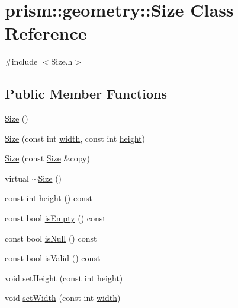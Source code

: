 \hypertarget{classprism_1_1geometry_1_1_size}{}\section{prism\+:\+:geometry\+:\+:Size Class Reference}
\label{classprism_1_1geometry_1_1_size}


{\ttfamily \#include $<$Size.\+h$>$}

\subsection*{Public Member Functions}
\begin{DoxyCompactItemize}
\item 
\hyperlink{classprism_1_1geometry_1_1_size_a82ca178677fefa36453103441b0e16d1}{Size} ()
\item 
\hyperlink{classprism_1_1geometry_1_1_size_a3df901a89d7ba9222266e45eea14aa80}{Size} (const int \hyperlink{classprism_1_1geometry_1_1_size_af52e54cbd5b29a1d9a2dfd3b56007d68}{width}, const int \hyperlink{classprism_1_1geometry_1_1_size_af4879e8eca4306cfe5d39b800ae191d1}{height})
\item 
\hyperlink{classprism_1_1geometry_1_1_size_a7a5a003c2ed1e52fc3c95e2abdeddee5}{Size} (const \hyperlink{classprism_1_1geometry_1_1_size}{Size} \&copy)
\item 
virtual \hyperlink{classprism_1_1geometry_1_1_size_a537e42c6a73305321ce4b8b28c7e1c90}{$\sim$\+Size} ()
\item 
const int \hyperlink{classprism_1_1geometry_1_1_size_af4879e8eca4306cfe5d39b800ae191d1}{height} () const 
\item 
const bool \hyperlink{classprism_1_1geometry_1_1_size_aa9b519af8f5708939fbd20f1b52ec28f}{is\+Empty} () const 
\item 
const bool \hyperlink{classprism_1_1geometry_1_1_size_a2867491b5a8215c61e58ad943ddb2811}{is\+Null} () const 
\item 
const bool \hyperlink{classprism_1_1geometry_1_1_size_ae6c9cd08771cc878b32fa7ef21b808c1}{is\+Valid} () const 
\item 
void \hyperlink{classprism_1_1geometry_1_1_size_a415d717d5d4dc026be63fe0fecca3747}{set\+Height} (const int \hyperlink{classprism_1_1geometry_1_1_size_af4879e8eca4306cfe5d39b800ae191d1}{height})
\item 
void \hyperlink{classprism_1_1geometry_1_1_size_ae0cec1e8ce5c2f4363e2d6f650d8949d}{set\+Width} (const int \hyperlink{classprism_1_1geometry_1_1_size_af52e54cbd5b29a1d9a2dfd3b56007d68}{width})

\end{DoxyCompactItemize}
